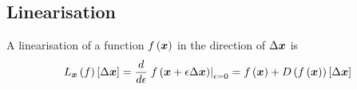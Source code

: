  
\subsection{Linearisation}
\label{subsec:Linearisation}

A linearisation of a function $ f\left( \boldsymbol{x} \right) $ in the direction of
$\Delta\boldsymbol{x}$ is
\begin{equation}
  \linearisation{f}{\vectr{x}}{\Delta\vectr{x}}=\dby{}{\epsilon}\evalat{\fnof{f}{\vectr{x}+\epsilon\Delta\vectr{x}}}{\epsilon=0}=\fnof{f}{\vectr{x}}+\directionalderiv{\fnof{f}{\vectr{x}}}{\Delta\vectr{x}}
\end{equation}
